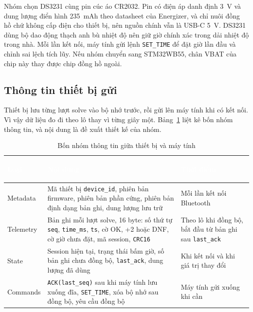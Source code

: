 Nhóm chọn DS3231 cùng pin cúc áo CR2032. Pin có điện áp danh định 3~V và dung lượng điển hình 235~mAh theo datasheet của Energizer, và chỉ nuôi đồng hồ chứ không cấp điện cho thiết bị, nên nguồn chính vẫn là USB-C 5~V. DS3231 dùng bộ dao động thạch anh bù nhiệt độ nên giữ giờ chính xác trong dải nhiệt độ trong nhà. Mỗi lần kết nối, máy tính gửi lệnh \texttt{SET\_TIME} để đặt giờ lần đầu và chỉnh sai lệch tích lũy. Nếu nhóm chuyển sang STM32WB55, chân VBAT của chip này thay được chip đồng hồ ngoài.

\subsection{Thông tin thiết bị gửi}
\label{sec:device-data}
Thiết bị lưu từng lượt solve vào bộ nhớ trước, rồi gửi lên máy tính khi có kết nối. Vì vậy dữ liệu đo đi theo lô thay vì từng giây một. Bảng~\ref{tab:device-data} liệt kê bốn nhóm thông tin, và nội dung là đề xuất thiết kế của nhóm.

\begin{table}[H]
    \centering
    \renewcommand{\arraystretch}{1.5}
    \caption{Bốn nhóm thông tin giữa thiết bị và máy tính}
    \label{tab:device-data}
    \begin{tabular}{>{\bfseries\raggedright\arraybackslash}m{2.4cm} >{\raggedright\arraybackslash}m{7.6cm} >{\raggedright\arraybackslash}m{4.4cm}}
        \toprule
        \rowcolor{haitayblue}
        \textcolor{white}{Loại} & \textcolor{white}{Nội dung} & \textcolor{white}{Thời điểm} \\
        \midrule
        \rowcolor{haitayblue!8}
        Metadata & Mã thiết bị \texttt{device\_id}, phiên bản firmware, phiên bản phần cứng, phiên bản định dạng bản ghi, dung lượng lưu trữ & Mỗi lần kết nối Bluetooth \\
        Telemetry & Bản ghi mỗi lượt solve, 16 byte: số thứ tự \texttt{seq}, \texttt{time\_ms}, \texttt{ts}, cờ OK, +2 hoặc DNF, cờ giờ chưa đặt, mã session, \texttt{CRC16} & Theo lô khi đồng bộ, bắt đầu từ bản ghi sau \texttt{last\_ack} \\
        \rowcolor{haitayblue!8}
        State & Session hiện tại, trạng thái bấm giờ, số bản ghi chưa đồng bộ, \texttt{last\_ack}, dung lượng đã dùng & Khi kết nối và khi giá trị thay đổi \\
        Commands & \texttt{ACK(last\_seq)} sau khi máy tính lưu xuống đĩa, \texttt{SET\_TIME}, xóa bộ nhớ sau đồng bộ, yêu cầu đồng bộ & Máy tính gửi xuống khi cần \\
        \bottomrule
    \end{tabular}
\end{table}


